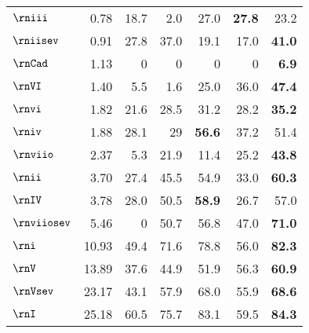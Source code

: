 \begin{tabular}{lr|rrrrr}
$\rniii$       & 0.78       & 18.7 & 2.0           & 27.0          & \textbf{27.8} & 23.2          \\
$\rniisev$       & 0.91       & 27.8 & 37.0          & 19.1          & 17.0          & \textbf{41.0} \\
$\rnCad$       & 1.13       & 0    & 0             & 0             & 0             & \textbf{6.9}  \\
$\rnVI$        & 1.40       & 5.5  & 1.6           & 25.0          & 36.0          & \textbf{47.4} \\
$\rnvi$        & 1.82       & 21.6 & 28.5          & 31.2          & 28.2          & \textbf{35.2} \\
$\rniv$        & 1.88       & 28.1 & 29            & \textbf{56.6} & 37.2          & 51.4          \\
$\rnviio$      & 2.37       & 5.3  & 21.9          & 11.4          & 25.2          & \textbf{43.8} \\
$\rnii$        & 3.70       & 27.4 & 45.5          & 54.9          & 33.0          & \textbf{60.3} \\
$\rnIV$        & 3.78       & 28.0 & 50.5          & \textbf{58.9} & 26.7          & 57.0          \\
$\rnviiosev$     & 5.46       & 0    & 50.7          & 56.8          & 47.0          & \textbf{71.0} \\
$\rni$         & 10.93      & 49.4 & 71.6          & 78.8          & 56.0          & \textbf{82.3} \\
$\rnV$         & 13.89      & 37.6 & 44.9          & 51.9          & 56.3          & \textbf{60.9} \\
$\rnVsev$        & 23.17      & 43.1 & 57.9          & 68.0          & 55.9          & \textbf{68.6} \\
$\rnI$         & 25.18      & 60.5 & 75.7          & 83.1          & 59.5          & \textbf{84.3}
\end{tabular}
